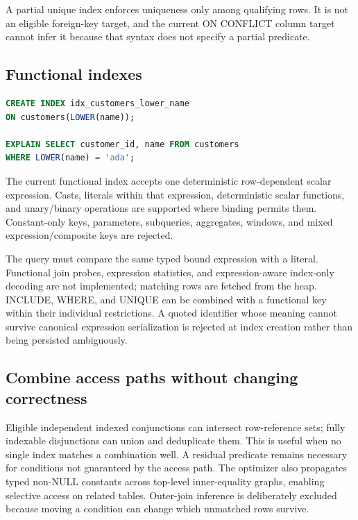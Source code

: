 A partial unique index enforces uniqueness only among qualifying rows. It is not an eligible foreign-key target, and the current ON CONFLICT column target cannot infer it because that syntax does not specify a partial predicate.

\subsection{Functional indexes}

\begin{lstlisting}[language=SQL]
CREATE INDEX idx_customers_lower_name
ON customers(LOWER(name));

EXPLAIN SELECT customer_id, name FROM customers
WHERE LOWER(name) = 'ada';
\end{lstlisting}

The current functional index accepts one deterministic row-dependent scalar expression. Casts, literals within that expression, deterministic scalar functions, and unary/binary operations are supported where binding permits them. Constant-only keys, parameters, subqueries, aggregates, windows, and mixed expression/composite keys are rejected.

The query must compare the same typed bound expression with a literal. Functional join probes, expression statistics, and expression-aware index-only decoding are not implemented; matching rows are fetched from the heap. INCLUDE, WHERE, and UNIQUE can be combined with a functional key within their individual restrictions. A quoted identifier whose meaning cannot survive canonical expression serialization is rejected at index creation rather than being persisted ambiguously.

\subsection{Combine access paths without changing correctness}

Eligible independent indexed conjunctions can intersect row-reference sets; fully indexable disjunctions can union and deduplicate them. This is useful when no single index matches a combination well. A residual predicate remains necessary for conditions not guaranteed by the access path. The optimizer also propagates typed non-NULL constants across top-level inner-equality graphs, enabling selective access on related tables. Outer-join inference is deliberately excluded because moving a condition can change which unmatched rows survive.

